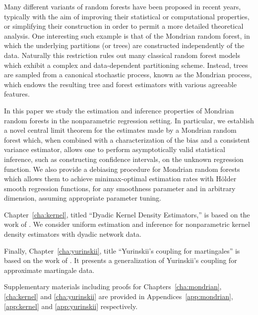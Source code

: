 Many different variants of random forests have been proposed in
recent years, typically with the aim of improving their statistical or
computational properties, or simplifying their construction in order to
permit a more detailed theoretical analysis.
One interesting such example is that of the Mondrian random forest,
in which the underlying partitions (or trees) are constructed
independently of the data. Naturally this restriction rules out many
classical random forest models which exhibit a complex and data-dependent
partitioning scheme. Instead, trees are sampled from a canonical
stochastic process, known as the Mondrian process, which endows the resulting
tree and forest estimators with various agreeable features.

In this paper we study the estimation and inference properties of
Mondrian random forests in the nonparametric
regression setting. In particular, we
establish a novel central limit theorem for the estimates
made by a Mondrian random forest which,
when combined with a characterization of the bias and a
consistent variance estimator,
allows one to perform asymptotically valid statistical inference,
such as constructing confidence intervals,
on the unknown regression function.
We also provide a debiasing procedure for Mondrian random
forests which allows them to achieve minimax-optimal estimation rates
with H{\"o}lder smooth regression functions, for any smoothness parameter
and in arbitrary dimension, assuming appropriate parameter tuning.

Chapter~\ref{cha:kernel},
titled ``Dyadic Kernel Density Estimators,''
is based on the work of \cite{cattaneo2024uniform}.
We consider uniform estimation and inference
for nonparametric kernel density estimators with dyadic
network data.

Finally, Chapter~\ref{cha:yurinskii},
title ``Yurinskii's coupling for martingales''
is based on the work of \cite{cattaneo2022yurinskii}.
It presents a generalization of Yurinskii's coupling
for approximate martingale data.

Supplementary materials including proofs for
Chapters~\ref{cha:mondrian}, \ref{cha:kernel} and \ref{cha:yurinskii}
are provided in Appendices~\ref{app:mondrian}, \ref{app:kernel}
and \ref{app:yurinskii} respectively.

